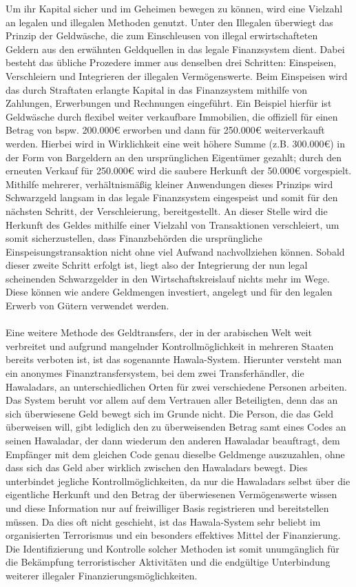 \documentclass[a4paper,11pt]{article}
\begin{document}
Um ihr Kapital sicher und im Geheimen bewegen zu können, wird eine Vielzahl an legalen und illegalen Methoden genutzt. Unter den Illegalen überwiegt das Prinzip der Geldwäsche, die zum Einschleusen von illegal erwirtschafteten Geldern aus den erwähnten Geldquellen in das legale Finanzsystem dient. Dabei besteht das übliche Prozedere immer aus denselben drei Schritten: Einspeisen, Verschleiern und Integrieren der illegalen Vermögenswerte. Beim Einspeisen wird das durch Straftaten erlangte Kapital in das Finanzsystem mithilfe von Zahlungen, Erwerbungen und Rechnungen eingeführt. Ein Beispiel hierfür ist Geldwäsche durch flexibel weiter verkaufbare Immobilien, die offiziell für einen Betrag von bspw. 200.000€ erworben und dann für 250.000€ weiterverkauft werden. Hierbei wird in Wirklichkeit eine weit höhere Summe (z.B. 300.000€) in der Form von Bargeldern an den ursprünglichen Eigentümer gezahlt; durch den erneuten Verkauf für 250.000€ wird die saubere Herkunft der 50.000€ vorgespielt. Mithilfe mehrerer, verhältnismäßig kleiner Anwendungen dieses Prinzips wird Schwarzgeld langsam in das legale Finanzsystem eingespeist und somit für den nächsten Schritt, der Verschleierung, bereitgestellt. An dieser Stelle wird die Herkunft des Geldes mithilfe einer Vielzahl von Transaktionen verschleiert, um somit sicherzustellen, dass Finanzbehörden die ursprüngliche Einspeisungstransaktion nicht ohne viel Aufwand nachvollziehen können. Sobald dieser zweite Schritt erfolgt ist, liegt also der Integrierung der nun legal scheinenden Schwarzgelder in den Wirtschaftskreislauf nichts mehr im Wege. Diese können wie andere Geldmengen investiert, angelegt und für den legalen Erwerb von Gütern verwendet werden.
\\ \\
Eine weitere Methode des Geldtransfers, der in der arabischen Welt weit verbreitet und aufgrund mangelnder Kontrollmöglichkeit in mehreren Staaten bereits verboten ist, ist das sogenannte Hawala-System. Hierunter versteht man ein anonymes Finanztransfersystem, bei dem zwei Transferhändler, die Hawaladars, an unterschiedlichen Orten für zwei verschiedene Personen arbeiten. Das System beruht vor allem auf dem Vertrauen aller Beteiligten, denn das an sich überwiesene Geld bewegt sich im Grunde nicht. Die Person, die das Geld überweisen will, gibt lediglich den zu überweisenden Betrag samt eines Codes an seinen Hawaladar, der dann wiederum den anderen Hawaladar beauftragt, dem Empfänger mit dem gleichen Code genau dieselbe Geldmenge auszuzahlen, ohne dass sich das Geld aber wirklich zwischen den Hawaladars bewegt. Dies unterbindet jegliche Kontrollmöglichkeiten, da nur die Hawaladars selbst über die eigentliche Herkunft und den Betrag der überwiesenen Vermögenswerte wissen und diese Information nur auf freiwilliger Basis registrieren und bereitstellen müssen. Da dies oft nicht geschieht, ist das Hawala-System sehr beliebt im organisierten Terrorismus und ein besonders effektives Mittel der Finanzierung. Die Identifizierung und Kontrolle solcher Methoden ist somit unumgänglich für die Bekämpfung terroristischer Aktivitäten und die endgültige Unterbindung weiterer illegaler Finanzierungsmöglichkeiten. 
\end{document}
